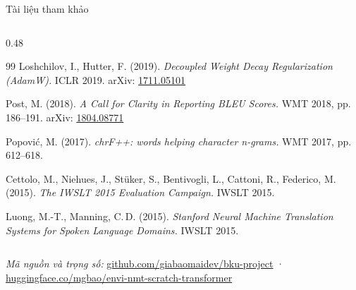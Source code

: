 \documentclass[aspectratio=169, 10pt]{beamer}
\newcommand{\tenlatin}[1]{{\fontencoding{T1}\selectfont #1}}
\begin{document}
\begin{frame}[shrink=25]{Tài liệu tham khảo}
\begin{columns}[T]
\begin{column}{0.48\textwidth}
\begin{thebibliography}{99}
    Loshchilov, I., Hutter, F. (2019).
    \textit{Decoupled Weight Decay Regularization (AdamW).}
    ICLR 2019.
    arXiv: \href{https://arxiv.org/abs/1711.05101}{1711.05101}

    Post, M. (2018).
    \textit{A Call for Clarity in Reporting BLEU Scores.}
    WMT 2018, pp.\,186--191.
    arXiv: \href{https://arxiv.org/abs/1804.08771}{1804.08771}

    \tenlatin{Popovi\'{c}}, M. (2017).
    \textit{chrF++: words helping character n-grams.}
    WMT 2017, pp.\,612--618.

    Cettolo, M., Niehues, J., \tenlatin{St\"{u}ker}, S., Bentivogli, L., Cattoni, R.,
    Federico, M. (2015).
    \textit{The IWSLT 2015 Evaluation Campaign.}
    IWSLT 2015.

    Luong, M.-T., Manning, C.\,D. (2015).
    \textit{Stanford Neural Machine Translation Systems for Spoken Language Domains.}
    IWSLT 2015.

      \end{thebibliography}
    \end{column}
  \end{columns}

  \vspace{0.2em}
  {\scriptsize\textit{Mã nguồn và trọng số:}
  \href{https://github.com/giabaomaidev/bku-project}{github.com/giabaomaidev/bku-project}
  ·
  \href{https://huggingface.co/mgbao/envi-nmt-scratch-transformer}{huggingface.co/mgbao/envi-nmt-scratch-transformer}}
\end{frame}


\end{document}
